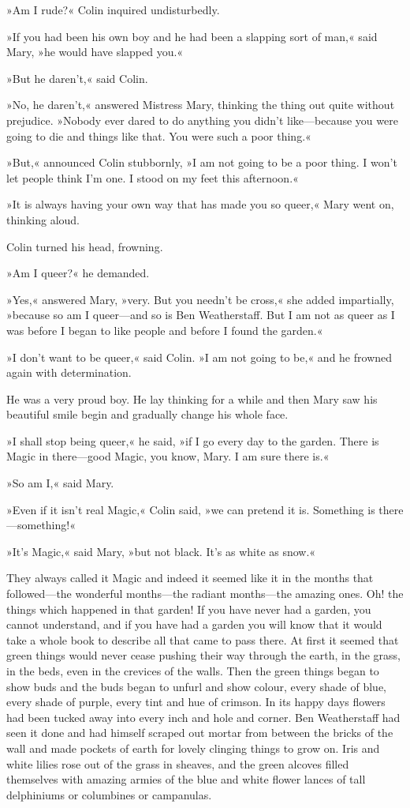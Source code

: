 »Am I rude?« Colin inquired undisturbedly.

»If you had been his own boy and he had been a slapping sort of man,« said Mary, »he would have slapped you.«

»But he daren't,« said Colin.

»No, he daren't,« answered Mistress Mary, thinking the thing out quite without prejudice. »Nobody ever dared to do anything you didn't like—because you were going to die and things like that. You were such a poor thing.«

»But,« announced Colin stubbornly, »I am not going to be a poor thing. I won't let people think I'm one. I stood on my feet this afternoon.«

»It is always having your own way that has made you so queer,« Mary went on, thinking aloud.

Colin turned his head, frowning.

»Am I queer?« he demanded.

»Yes,« answered Mary, »very. But you needn't be cross,« she added impartially, »because so am I queer—and so is Ben Weatherstaff. But I am not as queer as I was before I began to like people and before I found the garden.«

»I don't want to be queer,« said Colin. »I am not going to be,« and he frowned again with determination.

He was a very proud boy. He lay thinking for a while and then Mary saw his beautiful smile begin and gradually change his whole face.

»I shall stop being queer,« he said, »if I go every day to the garden. There is Magic in there—good Magic, you know, Mary. I am sure there is.«

»So am I,« said Mary.

»Even if it isn't real Magic,« Colin said, »we can pretend it is. Something is there—something!«

»It's Magic,« said Mary, »but not black. It's as white as snow.«

They always called it Magic and indeed it seemed like it in the months that followed—the wonderful months—the radiant months—the amazing ones. Oh! the things which happened in that garden! If you have never had a garden, you cannot understand, and if you have had a garden you will know that it would take a whole book to describe all that came to pass there. At first it seemed that green things would never cease pushing their way through the earth, in the grass, in the beds, even in the crevices of the walls. Then the green things began to show buds and the buds began to unfurl and show colour, every shade of blue, every shade of purple, every tint and hue of crimson. In its happy days flowers had been tucked away into every inch and hole and corner. Ben Weatherstaff had seen it done and had himself scraped out mortar from between the bricks of the wall and made pockets of earth for lovely clinging things to grow on. Iris and white lilies rose out of the grass in sheaves, and the green alcoves filled themselves with amazing armies of the blue and white flower lances of tall delphiniums or columbines or campanulas.

